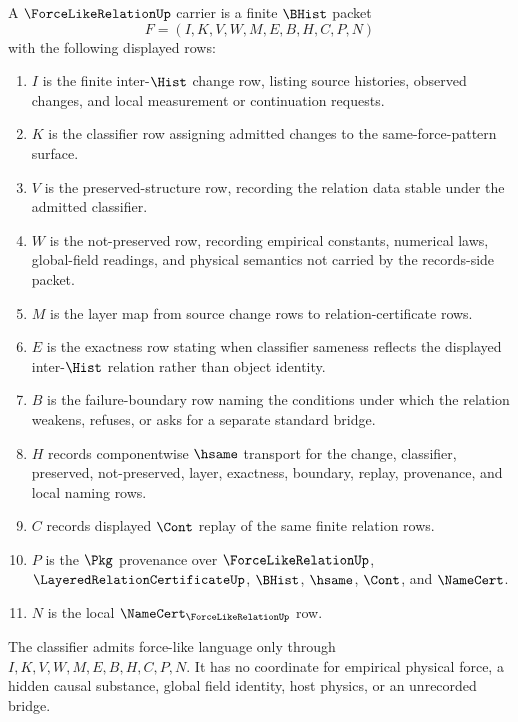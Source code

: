\begin{definition}
\label{def:force-like-relation-carrier}
A $\ForceLikeRelationUp$ carrier is a finite $\BHist$ packet
$$
F=(I,K,V,W,M,E,B,H,C,P,N)
$$
with the following displayed rows:
\begin{enumerate}
\item $I$ is the finite inter-$\Hist$ change row, listing source histories, observed changes, and local measurement or continuation requests.
\item $K$ is the classifier row assigning admitted changes to the same-force-pattern surface.
\item $V$ is the preserved-structure row, recording the relation data stable under the admitted classifier.
\item $W$ is the not-preserved row, recording empirical constants, numerical laws, global-field readings, and physical semantics not carried by the records-side packet.
\item $M$ is the layer map from source change rows to relation-certificate rows.
\item $E$ is the exactness row stating when classifier sameness reflects the displayed inter-$\Hist$ relation rather than object identity.
\item $B$ is the failure-boundary row naming the conditions under which the relation weakens, refuses, or asks for a separate standard bridge.
\item $H$ records componentwise $\hsame$ transport for the change, classifier, preserved, not-preserved, layer, exactness, boundary, replay, provenance, and local naming rows.
\item $C$ records displayed $\Cont$ replay of the same finite relation rows.
\item $P$ is the $\Pkg$ provenance over $\ForceLikeRelationUp$, $\LayeredRelationCertificateUp$, $\BHist$, $\hsame$, $\Cont$, and $\NameCert$.
\item $N$ is the local $\NameCert_{\ForceLikeRelationUp}$ row.
\end{enumerate}
The classifier admits force-like language only through $I,K,V,W,M,E,B,H,C,P,N$. It has no coordinate for empirical physical force, a hidden causal substance, global field identity, host physics, or an unrecorded bridge.
\end{definition}


